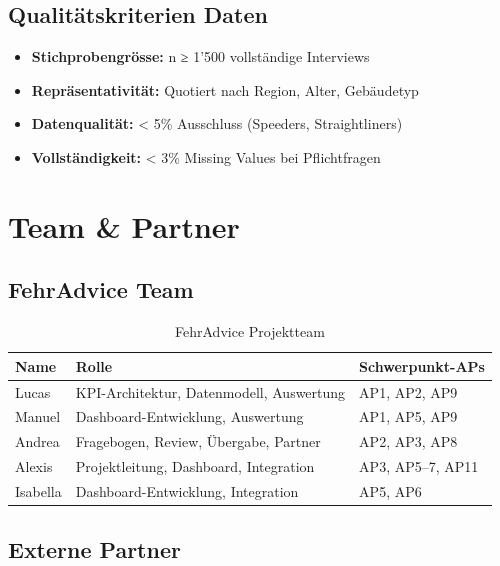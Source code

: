 \documentclass[11pt,a4paper]{article}
\begin{document}
\subsection{Qualitätskriterien Daten}

\begin{itemize}[leftmargin=*]
    \item \textbf{Stichprobengrösse:} n ≥ 1'500 vollständige Interviews
    \item \textbf{Repräsentativität:} Quotiert nach Region, Alter, Gebäudetyp
    \item \textbf{Datenqualität:} < 5\% Ausschluss (Speeders, Straightliners)
    \item \textbf{Vollständigkeit:} < 3\% Missing Values bei Pflichtfragen
\end{itemize}

\newpage

\section{Team \& Partner}

\subsection{FehrAdvice Team}

\begin{table}[h]
\centering
{}
\begin{tabular}{L{3cm}L{6cm}C{2.5cm}}
\toprule
\textbf{Name} & \textbf{Rolle} & \textbf{Schwerpunkt-APs} \\
\midrule
Lucas & KPI-Architektur, Datenmodell, Auswertung & AP1, AP2, AP9 \\
Manuel & Dashboard-Entwicklung, Auswertung & AP1, AP5, AP9 \\
Andrea & Fragebogen, Review, Übergabe, Partner & AP2, AP3, AP8 \\
Alexis & Projektleitung, Dashboard, Integration & AP3, AP5--7, AP11 \\
Isabella & Dashboard-Entwicklung, Integration & AP5, AP6 \\
\bottomrule
\end{tabular}
\caption{FehrAdvice Projektteam}
\end{table}

\subsection{Externe Partner}
\end{document}
